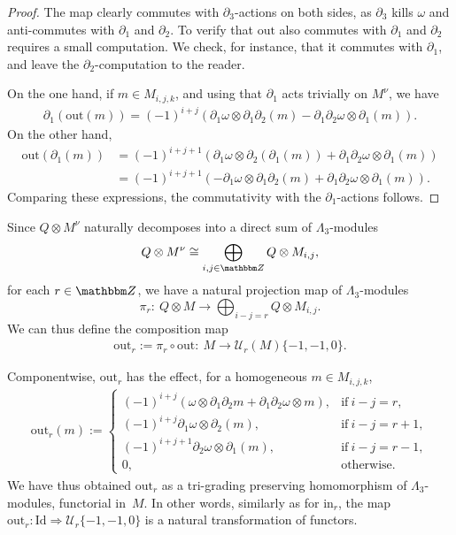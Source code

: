 \documentclass[pdftex]{sigma}
\theoremstyle{definition}
\numberwithin{equation}{section}
\def\Z{{\mathbbm Z}}
\def\dif{\partial}
\def\lra{{\longrightarrow}}
\def\Id{\mathrm{Id}}
\def\mc{\mathcal}
\begin{document}
\begin{proof}The map clearly commutes with $\dif_3$-actions on both sides, as $\dif_3$ kills $\omega$ and anti-commutes with $\dif_1$ and $\dif_2$. To verify that $\mathrm{out}$ also commutes with $\dif_1$ and $\dif_2$ requires a small computation. We check, for instance, that it commutes with $\dif_1$, and leave the $\dif_2$-computation to the reader.

On the one hand, if $m\in M_{i,j,k}$, and using that $\dif_1$ acts trivially on $M^\nu$, we have
\begin{gather*}
\dif_1(\mathrm{out}(m)) = (-1)^{i+j} (\dif_1\omega\otimes \dif_1\dif_2(m)-\dif_1\dif_2\omega\otimes \dif_1 (m)).
\end{gather*}
On the other hand,
\begin{align*}
\mathrm{out}(\dif_1(m))& = (-1)^{i+j+1}\left( \dif_1\omega \otimes \dif_2(\dif_1(m))+\dif_1\dif_2\omega\otimes \dif_1(m)\right) \nonumber\\
& = (-1)^{i+j+1}\left( - \dif_1\omega \otimes \dif_1\dif_2(m)+\dif_1\dif_2\omega\otimes \dif_1(m)\right) .
\end{align*}
Comparing these expressions, the commutativity with the $\dif_1$-actions follows.
\end{proof}

Since $Q\otimes M^\nu$ naturally decomposes into a direct sum of $\Lambda_3$-modules
\[
Q\otimes M^\nu\cong \bigoplus_{i,j\in \Z} Q\otimes M_{i,j},
\]
for each $r\in \Z$, we have a natural projection map of $\Lambda_3$-modules
\[
\pi_r\colon \ Q\otimes M\lra \bigoplus_{i-j=r} Q\otimes M_{i,j}.
\]
We can thus define the composition map
\begin{gather*}%
\mathrm{out}_r:=\pi_r\circ\mathrm{out}\colon \ M\lra \mc{U}_r(M)\{-1,-1,0\}.
\end{gather*}

Componentwise, $\mathrm{out}_r$ has the effect, for a homogeneous $m\in M_{i,j,k}$,
\begin{gather}\label{eqn-out-componentwise}
\mathrm{out}_r(m):=
\begin{cases}
(-1)^{i+j} (\omega \otimes \dif_1\dif_2 m+ \dif_1\dif_2\omega \otimes m), & \textrm{if}~i-j=r,\\
(-1)^{i+j}\dif_1\omega \otimes \dif_2(m), & \textrm{if}~i-j=r+1, \\
(-1)^{i+j+1} \dif_2\omega \otimes \dif_1(m), & \textrm{if}~i-j=r-1,\\
0, & \textrm{otherwise}.
\end{cases}
\end{gather}
We have thus obtained $\mathrm{out}_r$ as a tri-grading preserving homomorphism of $\Lambda_3$-modules, functorial in~$M$. In other words, similarly as for $\mathrm{in}_r$, the map $\mathrm{out}_r\colon \Id\Rightarrow \mc{U}_r\{-1,-1,0\}$ is a natural transformation of functors.
\end{document}
